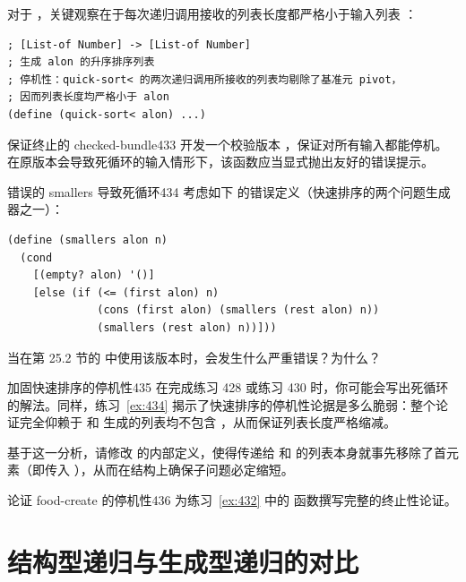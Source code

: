 对于 ，关键观察在于每次递归调用接收的列表长度都严格小于输入列表 ：

\begin{lstlisting}[language=BSL]
; [List-of Number] -> [List-of Number]
; 生成 alon 的升序排序列表
; 停机性：quick-sort< 的两次递归调用所接收的列表均剔除了基准元 pivot，
; 因而列表长度均严格小于 alon
(define (quick-sort< alon) ...)
\end{lstlisting}

\begin{exercise}{保证终止的 checked-bundle}{433}\label{ex:433}
开发一个校验版本 ，保证对所有输入都能停机。在原版本会导致死循环的输入情形下，该函数应当显式抛出友好的错误提示。
\end{exercise}

\begin{exercise}{错误的 smallers 导致死循环}{434}\label{ex:434}
考虑如下  的错误定义（快速排序的两个问题生成器之一）：

\begin{lstlisting}[language=BSL]
(define (smallers alon n)
  (cond
    [(empty? alon) '()]
    [else (if (<= (first alon) n)
              (cons (first alon) (smallers (rest alon) n))
              (smallers (rest alon) n))]))
\end{lstlisting}

当在第 25.2 节的  中使用该版本时，会发生什么严重错误？为什么？
\end{exercise}

\begin{exercise}{加固快速排序的停机性}{435}\label{ex:435}
在完成练习 428 或练习 430 时，你可能会写出死循环的解法。同样，练习~\ref{ex:434} 揭示了快速排序的停机性论据是多么脆弱：整个论证完全仰赖于  和  生成的列表均不包含 ，从而保证列表长度严格缩减。

基于这一分析，请修改  的内部定义，使得传递给  和  的列表本身就事先移除了首元素（即传入 ），从而在结构上确保子问题必定缩短。
\end{exercise}

\begin{exercise}{论证 food-create 的停机性}{436}\label{ex:436}
为练习~\ref{ex:432} 中的  函数撰写完整的终止性论证。
\end{exercise}

\section{结构型递归与生成型递归的对比}
\label{sec:26_3}


